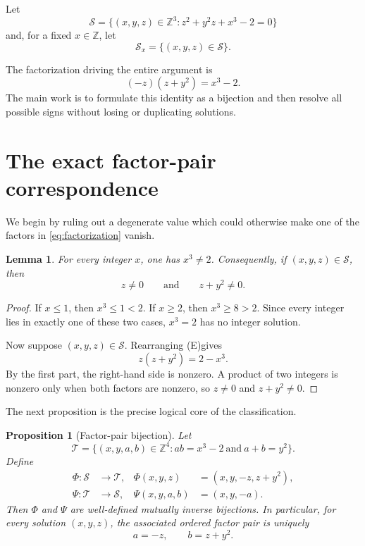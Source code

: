 \documentclass[11pt,a4paper]{article}
\newtheorem{proposition}[theorem]{Proposition}
\newtheorem{lemma}[theorem]{Lemma}
\theoremstyle{definition}
\theoremstyle{remark}
\newcommand{\Z}{\mathbb Z}
\newcommand{\Sols}{\mathscr S}
\newcommand{\eqE}{\textup{(E)}}
\begin{document}
Let
\[
 \Sols=\{(x,y,z)\in\Z^3:z^2+y^2z+x^3-2=0\}
\]
and, for a fixed $x\in\Z$, let
\[
 \Sols_x=\{(x,y,z)\in\Sols\}.
\]

The factorization driving the entire argument is
\begin{equation}
 (-z)(z+y^2)=x^3-2.
 \label{eq:factorization}
\end{equation}
The main work is to formulate this identity as a bijection and then resolve
all possible signs without losing or duplicating solutions.

\section{The exact factor-pair correspondence}

We begin by ruling out a degenerate value which could otherwise make one of
the factors in \eqref{eq:factorization} vanish.

\begin{lemma}\label{lem:no-cube-two}
For every integer $x$, one has $x^3\neq2$.
Consequently, if $(x,y,z)\in\Sols$, then
\[
 z\neq0
 \qquad\text{and}\qquad
 z+y^2\neq0.
\]
\end{lemma}

\begin{proof}
If $x\leq1$, then $x^3\leq1<2$.  If $x\geq2$, then
$x^3\geq8>2$.  Since every integer lies in exactly one of these two cases,
$x^3=2$ has no integer solution.

Now suppose $(x,y,z)\in\Sols$.  Rearranging \eqE gives
\[
 z(z+y^2)=2-x^3.
\]
By the first part, the right-hand side is nonzero.  A product of two integers
is nonzero only when both factors are nonzero, so $z\neq0$ and
$z+y^2\neq0$.
\end{proof}

The next proposition is the precise logical core of the classification.

\begin{proposition}[Factor-pair bijection]\label{prop:bijection}
Let
\[
 \mathscr T=
 \bigl\{(x,y,a,b)\in\Z^4:
       ab=x^3-2\ \text{and}\ a+b=y^2\bigr\}.
\]
Define
\begin{align*}
 \Phi:\Sols&\longrightarrow\mathscr T,
 &\Phi(x,y,z)&=(x,y,-z,z+y^2),\\
 \Psi:\mathscr T&\longrightarrow\Sols,
 &\Psi(x,y,a,b)&=(x,y,-a).
\end{align*}
Then $\Phi$ and $\Psi$ are well-defined mutually inverse bijections.
In particular, for every solution $(x,y,z)$, the associated ordered factor
pair is uniquely
\begin{equation}
 a=-z,
 \qquad
 b=z+y^2.
 \label{eq:unique-ab}
\end{equation}
\end{proposition}
\end{document}
